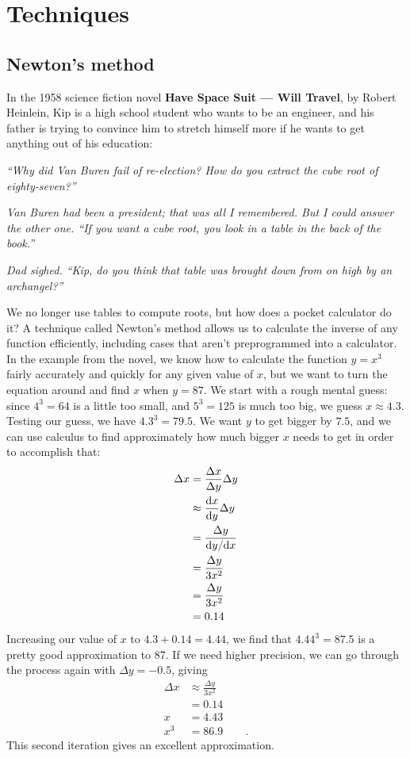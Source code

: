 \chapter{Techniques}

\section{Newton's method}\label{sec:newtons-method}

In the 1958 science fiction novel \textbf{Have Space Suit --- Will Travel}, by
Robert Heinlein, Kip is a high school student who wants to be an engineer,
and his father is trying to convince him to stretch himself more if he
wants to get anything out of his education:

\newcommand{\quoted}[1]{\textit{#1}}

\quoted{``Why did Van Buren fail of re-election? How do you extract the cube
root of eighty-seven?''}

\quoted{Van Buren had been a president; that was all I remembered. But I could
answer the other one. ``If you want a cube root, you look in a table
in the back of the book.''}

\quoted{Dad sighed. ``Kip, do you think that table was brought down from on
high by an archangel?''}

We no longer use tables to compute roots, but how does a pocket calculator
do it? A technique called Newton's method allows us to calculate
the inverse of any function efficiently, including cases that aren't
preprogrammed into a calculator. In the example from the novel,
we know how to calculate the function $y=x^3$ fairly accurately and
quickly for any given value of $x$, but we want to turn the equation
around and find $x$ when $y=87$. We start with a rough mental guess:
since $4^3=64$ is a little too small, and $5^3=125$ is much too big,
we guess $x\approx 4.3$. Testing our guess, we have
$4.3^3=79.5$. We want $y$ to get bigger by $7.5$, and we can use
calculus to find approximately how much bigger $x$ needs to get
in order to accomplish that:
\begin{align*}
  \Delta x &= \frac{\Delta x}{\Delta y} \Delta y \\
           &\approx \frac{\textup{d} x}{\textup{d} y} \Delta y \\
           &= \frac{\Delta y}{\textup{d} y/\textup{d} x} \\
           &= \frac{\Delta y}{3x^2} \\
           &= \frac{\Delta y}{3x^2} \\
           &= 0.14
\end{align*}
Increasing our value of $x$ to $4.3+0.14=4.44$, we find that 
$4.44^3=87.5$ is a pretty good approximation to 87. If we need higher
precision, we can go through the process again with $\Delta y=-0.5$,
giving
\begin{align*}
  \Delta x &\approx \frac{\Delta y}{3x^2} \\
           &= 0.14 \\
  x &= 4.43 \\
  x^3 &= 86.9 \qquad .
\end{align*}
This second iteration gives an excellent approximation.

